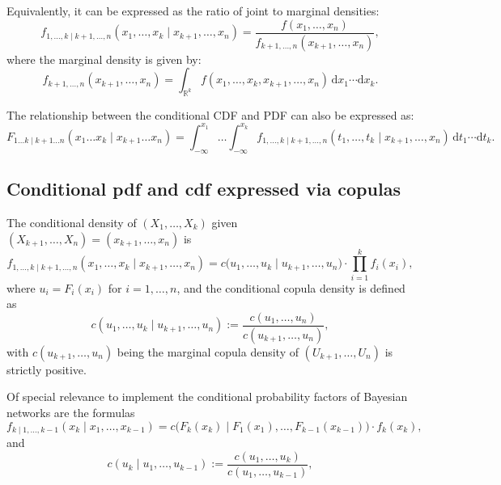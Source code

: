 Equivalently, it can be expressed as the ratio of joint to marginal densities:
\begin{equation}\label{eq:conditional_pdf_ratio}
f_{1,\ldots,k \mid k+1,\ldots,n}(x_1,\ldots,x_k \mid x_{k+1},\ldots,x_n)
=
\frac{
f(x_1,\ldots,x_n)
}{
f_{k+1,\ldots,n}(x_{k+1},\ldots,x_n)
},
\end{equation}
where the marginal density is given by:
\begin{equation}\label{eq:marginal_density}
f_{k+1,\ldots,n}(x_{k+1},\ldots,x_n)
=
\int_{\mathbb{R}^k}
f(x_1,\ldots,x_k, x_{k+1},\ldots,x_n) \, \mathrm{d}x_1 \cdots \mathrm{d}x_k.
\end{equation}

\begin{remarkbox}
\begin{remarkT}
The relationship between the conditional CDF and PDF can also be expressed as:
\begin{equation}\label{eq:cdf_from_pdf}
F_{1\ldots k \mid k+1\ldots n}(x_1\ldots x_k \mid x_{k+1}\ldots x_n)
=\!\!
\int_{-\infty}^{x_1} \!\!\!\! \ldots \!\!\!\! \int_{-\infty}^{x_k}
f_{1,\ldots,k \mid k+1,\ldots,n}(t_1,\ldots,t_k \mid x_{k+1},\ldots,x_n)
\, \mathrm{d}t_1 \cdots \mathrm{d}t_k.
\end{equation}
\end{remarkT}
\end{remarkbox}

\subsection{Conditional pdf and cdf expressed via copulas}
The conditional density of $(X_1,\ldots,X_k)$ given $(X_{k+1},\ldots,X_n) = (x_{k+1},\ldots,x_n)$ is
\begin{equation}\label{eq:conditional_density_copula}
f_{1,\ldots,k \mid k+1,\ldots,n}(x_1,\ldots,x_k \mid x_{k+1},\ldots,x_n)
= c\bigl(u_1,\ldots,u_k \mid u_{k+1},\ldots,u_n\bigr)
\cdot \prod_{i=1}^k f_i(x_i),
\end{equation}
where $u_i = F_i(x_i)$ for $i=1,\ldots,n$, and the conditional copula density is defined as
\begin{equation}\label{eq:conditional_copula_density}
c(u_1,\ldots,u_k \mid u_{k+1},\ldots,u_n)
:= \frac{
c(u_1,\ldots,u_n)
}{
c(u_{k+1},\ldots,u_n)
},
\end{equation}
with $c(u_{k+1},\ldots,u_n)$ being the marginal copula density of $(U_{k+1},\ldots,U_n)$ is strictly positive.

Of special relevance to implement the conditional probability factors of Bayesian networks are the formulas
\begin{equation}\label{eq:conditional_BN}
f_{k\mid 1,\ldots,k-1}(x_k\mid x_{1},\ldots,x_{k-1})
= c\bigl(F_k(x_k)\mid F_1(x_1),\ldots,F_{k-1}(x_{k-1})\bigr)
\cdot f_k(x_k),
\end{equation}
and
\begin{equation}\label{eq:conditional_BN1}
c(u_k\mid u_{1},\ldots,u_{k-1})
:= \frac{
c(u_1,\ldots,u_k)}{
c(u_{1},\ldots,u_{k-1})
},
\end{equation}

